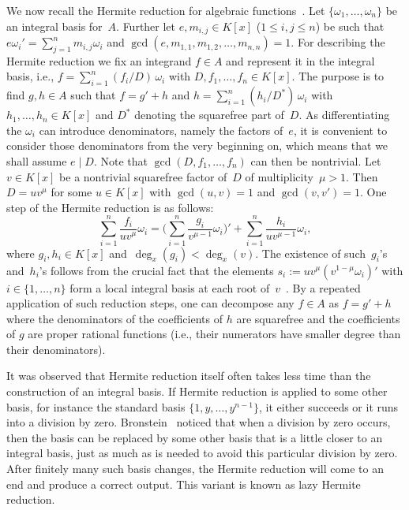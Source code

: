 \documentclass{sig-alternate}
\begin{document}
We now recall the Hermite reduction for algebraic functions~\cite{trager84,ACA1992,bronstein98}.
Let $\{\omega_1,\ldots,\omega_n\}$ be an integral basis for~$A$.
Further let $e, m_{i,j}\in K[x]$ ($1\leq i,j\leq n$) be such that
$e\omega_i'=\sum_{j=1}^n m_{i,j}\omega_i$ and
$\gcd(e,m_{1,1},m_{1,2},\ldots,m_{n,n})=1$.
For describing the Hermite reduction we fix an integrand $f\in A$ and represent it in the
integral basis, i.e., $f=\sum_{i=1}^n (f_i/D)\,\omega_i$ with
$D, f_1,\ldots,f_n\in K[x]$. The purpose is to find $g, h\in A$ such that
$f=g' + h$ and $h=\sum_{i=1}^n(h_i/D^\ast)\,\omega_i$ with $h_1,\ldots,h_n\in K[x]$
and $D^\ast$ denoting the squarefree part of~$D$.
As differentiating the $\omega_i$ can introduce
denominators, name\-ly the factors of~$e$, it is convenient to consider those
denominators from the very beginning on, which means that we shall assume
$e\mid D$. Note that $\gcd(D,f_1,\ldots,f_n)$ can then be nontrivial.
Let~$v\in K[x]$ be a nontrivial squarefree factor of~$D$ of multiplicity~$\mu>1$.
Then~$D = uv^\mu$ for some $u\in K[x]$ with $\gcd(u, v)=1$ and $\gcd(v,v')=1$.
One step of the Hermite reduction is as follows:
\begin{equation}\label{eq:hred}
  \sum_{i=1}^n \frac{f_i}{uv^\mu}\omega_i =
  \biggl(\sum_{i=1}^n\frac{g_i}{v^{\mu-1}}\omega_i\biggr)' +
  \sum_{i=1}^n \frac{h_i}{uv^{\mu-1}}\omega_i,
\end{equation}
where $g_i, h_i \in K[x]$ and~$\deg_x(g_i)< \deg_x(v)$.
The existence of such~$g_i$'s and~$h_i$'s follows from the crucial fact that
the elements $s_i :=  uv^\mu(v^{1-\mu}\omega_i)'$ with $i\in \{ 1, \ldots, n\}$
form a local integral basis at each root of~$v$~\cite[page 46]{trager84}.
By a repeated application of such reduction steps, one can decompose any $f\in A$
as $f=g' + h$ where the denominators of the coefficients of $h$ are squarefree
and the coefficients of $g$ are proper rational functions (i.e., their numerators
have smaller degree than their denominators).

It was observed that Hermite reduction itself often takes less time than the construction
of an integral basis. If Hermite reduction is applied to some other basis, for instance
the standard basis $\{1,y,\dots,y^{n-1}\}$, it either succeeds or it runs into a division by zero.
Bronstein~\cite{bronstein98a} noticed that when a division by zero occurs, then the basis can
be replaced by some other basis that is a little closer to an integral basis, just
as much as is needed to avoid this particular division by zero. After finitely many
such basis changes, the Hermite reduction will come to an end and produce a correct
output. This variant is known as lazy Hermite reduction.
\end{document}
